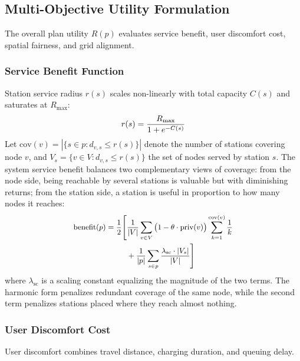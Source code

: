 \documentclass[10pt, conference, a4paper, compsocconf]{IEEEtran}
\begin{document}
\subsection{Multi-Objective Utility Formulation}

The overall plan utility $R(p)$ evaluates service benefit, user discomfort cost, spatial fairness, and grid alignment.

\subsubsection{Service Benefit Function}
Station service radius $r(s)$ scales non-linearly with total capacity $C(s)$ and saturates at $R_{\max}$:
\begin{equation}\small
r(s) = \frac{R_{\max}}{1 + e^{-C(s)}}
\end{equation}
Let $\text{cov}(v) = |\{ s \in p : d_{v,s} \le r(s) \}|$ denote the number of stations covering node $v$, and $V_s = \{ v \in V : d_{v,s} \le r(s) \}$ the set of nodes served by station $s$. The system service benefit balances two complementary views of coverage: from the node side, being reachable by several stations is valuable but with diminishing returns; from the station side, a station is useful in proportion to how many nodes it reaches:
\begin{equation}\small
\begin{aligned}
\text{benefit}(p) = \frac{1}{2} \Bigg[ &\frac{1}{|V|} \sum_{v \in V} \big(1 - \theta \cdot \text{priv}(v)\big) \sum_{k=1}^{\text{cov}(v)} \frac{1}{k} \\
&+ \frac{1}{|p|} \sum_{s \in p} \frac{\lambda_{\text{sc}} \cdot |V_s|}{|V|} \Bigg]
\end{aligned}
\end{equation}
where $\lambda_{\text{sc}}$ is a scaling constant equalizing the magnitude of the two terms. The harmonic form penalizes redundant coverage of the same node, while the second term penalizes stations placed where they reach almost nothing.

\subsubsection{User Discomfort Cost}
User discomfort combines travel distance, charging duration, and queuing delay.
\end{document}
